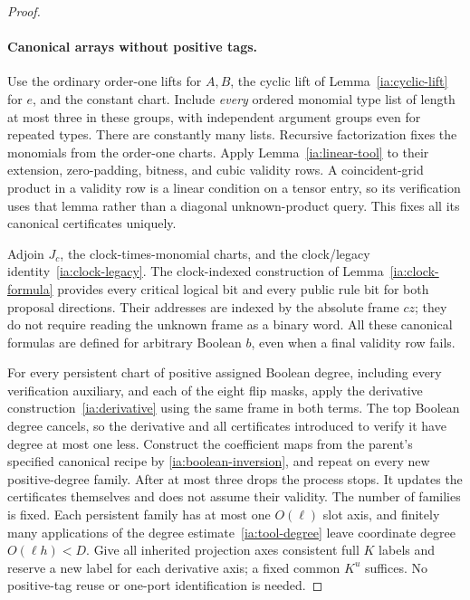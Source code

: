 \begin{proof}
\paragraph{Canonical arrays without positive tags.}
Use the ordinary order-one lifts for \(A,B\), the cyclic lift of
Lemma~\ref{ia:cyclic-lift} for \(e\), and the constant chart. Include
\emph{every} ordered monomial type list of length at most three
in these groups, with independent argument groups even for repeated
types. There are constantly many lists. Recursive factorization
fixes the monomials from the order-one charts. Apply
Lemma~\ref{ia:linear-tool} to their extension, zero-padding, bitness,
and cubic validity rows. A coincident-grid product in a validity
row is a linear condition on a tensor entry, so its verification
uses that lemma rather than a diagonal unknown-product query.
This fixes all its canonical certificates uniquely.

Adjoin \(J_c\), the clock-times-monomial charts, and the clock/legacy
identity~\eqref{ia:clock-legacy}. The clock-indexed construction
of Lemma~\ref{ia:clock-formula} provides every critical logical bit
and every public rule bit for both proposal directions. Their
addresses are indexed by the absolute frame \(cz\); they do not
require reading the unknown frame as a binary word. All these
canonical formulas are defined for arbitrary Boolean \(b\), even
when a final validity row fails.

For every persistent chart of positive assigned Boolean degree,
including every verification auxiliary, and each of the eight
flip masks, apply the derivative construction~\eqref{ia:derivative}
using the same frame in both terms. The top Boolean degree cancels,
so the derivative and all certificates introduced to verify it
have degree at most one less. Construct the coefficient maps from
the parent's specified canonical recipe by
\eqref{ia:boolean-inversion}, and repeat on every new positive-degree
family. After at most three drops the process stops. It updates
the certificates themselves and does not assume their validity.
The number of families is fixed. Each persistent family has at
most one \(O(\ell)\) slot axis, and finitely many applications of
the degree estimate~\eqref{ia:tool-degree} leave coordinate degree
\(O(\ell h)<D\). Give all inherited projection axes consistent
full \(K\) labels and reserve a new label for each derivative
axis; a fixed common \(K^u\) suffices. No positive-tag reuse or
one-port identification is needed.


\end{proof}
